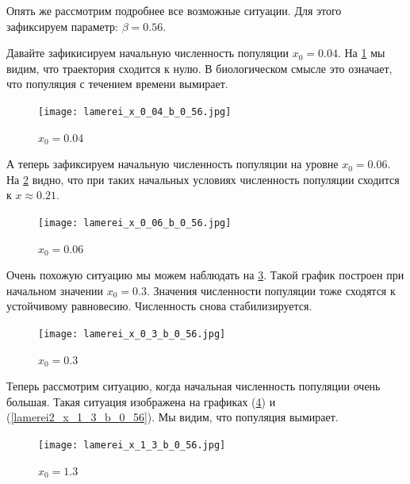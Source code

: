         Опять же рассмотрим подробнее все возможные ситуации. Для этого зафиксируем параметр: \(\beta = 0.56\). 
    
        Давайте зафикисируем начальную численность популяции \(x_0 = 0.04\). На \ref{lamerei_x_0_04_b_0_56} мы видим, что траектория сходится к нулю. В биологическом смысле это означает, что популяция с течением времени вымирает.
    
        \begin{figure}
            \centering
            \texttt{[image: lamerei\_x\_0\_04\_b\_0\_56.jpg]}
    
            \captionsetup{justification=centering}
            \caption{\(x_0 = 0.04\)}
            \label{lamerei_x_0_04_b_0_56}
        \end{figure}
    
        А теперь зафиксируем начальную численность популяции на уровне \(x_0 = 0.06\). На \ref{lamerei_x_0_06_b_0_56} видно, что при таких начальных условиях численность популяции сходится к \(x \approx 0.21\).
            
        \begin{figure}
            \centering
            \texttt{[image: lamerei\_x\_0\_06\_b\_0\_56.jpg]}
    
            \captionsetup{justification=centering}
            \caption{\(x_0 = 0.06\)}
            \label{lamerei_x_0_06_b_0_56}
        \end{figure}
    
        Очень похожую ситуацию мы можем наблюдать на \ref{lamerei_x_0_3_b_0_56}. Такой график построен при начальном значении \(x_0 = 0.3\). Значения численности популяции тоже сходятся к устойчивому равновесию. Численность снова стабилизируется.
            
        \begin{figure}
            \centering
            \texttt{[image: lamerei\_x\_0\_3\_b\_0\_56.jpg]}
    
            \captionsetup{justification=centering}
            \caption{\(x_0 = 0.3\)}
            \label{lamerei_x_0_3_b_0_56}
        \end{figure}
    
        Теперь рассмотрим ситуацию, когда начальная численность популяции очень большая. Такая ситуация изображена на графиках (\ref{lamerei_x_1_3_b_0_56}) и (\ref{lamerei2_x_1_3_b_0_56}). Мы видим, что популяция вымирает.
            
        \begin{figure}
            \centering
            \texttt{[image: lamerei\_x\_1\_3\_b\_0\_56.jpg]}
    
            \captionsetup{justification=centering}
            \caption{\(x_0 = 1.3\)}
            \label{lamerei_x_1_3_b_0_56}
        \end{figure}
            
